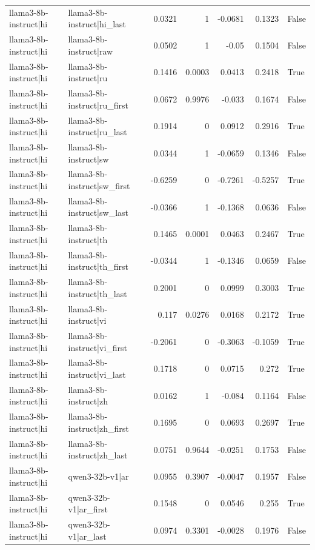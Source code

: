 \begin{table}
\begin{tabular}{l l r r r r l}
llama3-8b-instruct|hi & llama3-8b-instruct|hi_last & 0.0321 & 1 & -0.0681 & 0.1323 & False \\
llama3-8b-instruct|hi & llama3-8b-instruct|raw & 0.0502 & 1 & -0.05 & 0.1504 & False \\
llama3-8b-instruct|hi & llama3-8b-instruct|ru & 0.1416 & 0.0003 & 0.0413 & 0.2418 & True \\
llama3-8b-instruct|hi & llama3-8b-instruct|ru_first & 0.0672 & 0.9976 & -0.033 & 0.1674 & False \\
llama3-8b-instruct|hi & llama3-8b-instruct|ru_last & 0.1914 & 0 & 0.0912 & 0.2916 & True \\
llama3-8b-instruct|hi & llama3-8b-instruct|sw & 0.0344 & 1 & -0.0659 & 0.1346 & False \\
llama3-8b-instruct|hi & llama3-8b-instruct|sw_first & -0.6259 & 0 & -0.7261 & -0.5257 & True \\
llama3-8b-instruct|hi & llama3-8b-instruct|sw_last & -0.0366 & 1 & -0.1368 & 0.0636 & False \\
llama3-8b-instruct|hi & llama3-8b-instruct|th & 0.1465 & 0.0001 & 0.0463 & 0.2467 & True \\
llama3-8b-instruct|hi & llama3-8b-instruct|th_first & -0.0344 & 1 & -0.1346 & 0.0659 & False \\
llama3-8b-instruct|hi & llama3-8b-instruct|th_last & 0.2001 & 0 & 0.0999 & 0.3003 & True \\
llama3-8b-instruct|hi & llama3-8b-instruct|vi & 0.117 & 0.0276 & 0.0168 & 0.2172 & True \\
llama3-8b-instruct|hi & llama3-8b-instruct|vi_first & -0.2061 & 0 & -0.3063 & -0.1059 & True \\
llama3-8b-instruct|hi & llama3-8b-instruct|vi_last & 0.1718 & 0 & 0.0715 & 0.272 & True \\
llama3-8b-instruct|hi & llama3-8b-instruct|zh & 0.0162 & 1 & -0.084 & 0.1164 & False \\
llama3-8b-instruct|hi & llama3-8b-instruct|zh_first & 0.1695 & 0 & 0.0693 & 0.2697 & True \\
llama3-8b-instruct|hi & llama3-8b-instruct|zh_last & 0.0751 & 0.9644 & -0.0251 & 0.1753 & False \\
llama3-8b-instruct|hi & qwen3-32b-v1|ar & 0.0955 & 0.3907 & -0.0047 & 0.1957 & False \\
llama3-8b-instruct|hi & qwen3-32b-v1|ar_first & 0.1548 & 0 & 0.0546 & 0.255 & True \\
llama3-8b-instruct|hi & qwen3-32b-v1|ar_last & 0.0974 & 0.3301 & -0.0028 & 0.1976 & False \\

\end{tabular}
\end{table}
